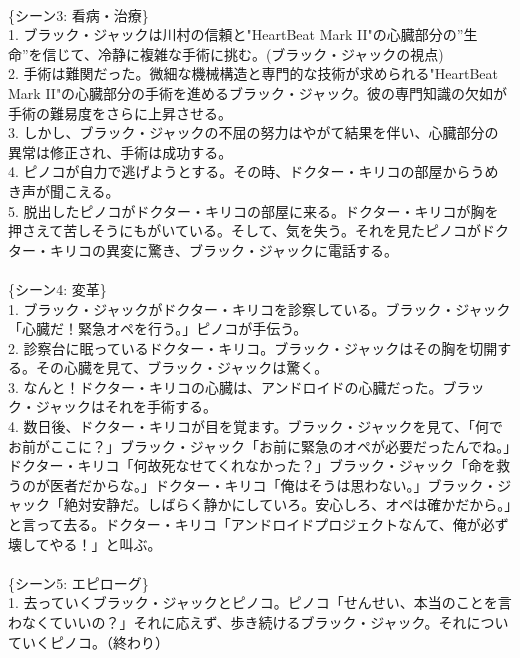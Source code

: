 \documentclass[a4j,12pt]{jsreport}
\begin{document}
\begin{breakitembox}
   \\
   \{シーン3: 看病・治療\}\\
   1. ブラック・ジャックは川村の信頼と"HeartBeat Mark II"の心臓部分の”生命”を信じて、冷静に複雑な手術に挑む。(ブラック・ジャックの視点)\\
   2. 手術は難関だった。微細な機械構造と専門的な技術が求められる"HeartBeat Mark II"の心臓部分の手術を進めるブラック・ジャック。彼の専門知識の欠如が手術の難易度をさらに上昇させる。\\
   3. しかし、ブラック・ジャックの不屈の努力はやがて結果を伴い、心臓部分の異常は修正され、手術は成功する。\\
   4. ピノコが自力で逃げようとする。その時、ドクター・キリコの部屋からうめき声が聞こえる。\\
   5. 脱出したピノコがドクター・キリコの部屋に来る。ドクター・キリコが胸を押さえて苦しそうにもがいている。そして、気を失う。それを見たピノコがドクター・キリコの異変に驚き、ブラック・ジャックに電話する。\\
   \\
   \{シーン4: 変革\}\\
   1. ブラック・ジャックがドクター・キリコを診察している。ブラック・ジャック「心臓だ！緊急オペを行う。」ピノコが手伝う。\\
   2. 診察台に眠っているドクター・キリコ。ブラック・ジャックはその胸を切開する。その心臓を見て、ブラック・ジャックは驚く。\\
   3. なんと！ドクター・キリコの心臓は、アンドロイドの心臓だった。ブラック・ジャックはそれを手術する。\\
   4. 数日後、ドクター・キリコが目を覚ます。ブラック・ジャックを見て、「何でお前がここに？」ブラック・ジャック「お前に緊急のオペが必要だったんでね。」ドクター・キリコ「何故死なせてくれなかった？」ブラック・ジャック「命を救うのが医者だからな。」ドクター・キリコ「俺はそうは思わない。」ブラック・ジャック「絶対安静だ。しばらく静かにしていろ。安心しろ、オペは確かだから。」と言って去る。ドクター・キリコ「アンドロイドプロジェクトなんて、俺が必ず壊してやる！」と叫ぶ。\\
   \\
   \{シーン5: エピローグ\}\\
   1. 去っていくブラック・ジャックとピノコ。ピノコ「せんせい、本当のことを言わなくていいの？」それに応えず、歩き続けるブラック・ジャック。それについていくピノコ。（終わり）
   
\end{breakitembox}
\end{document}
